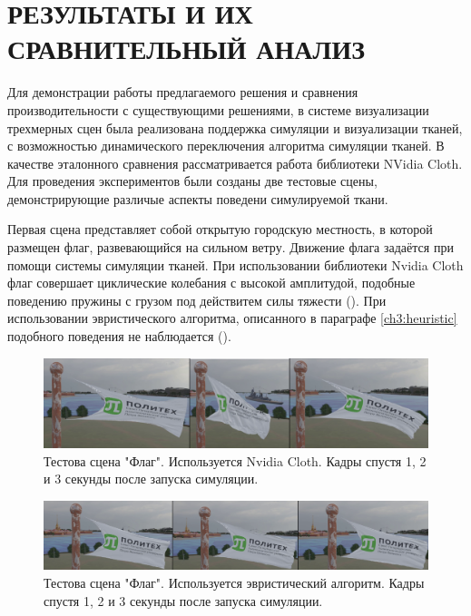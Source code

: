 \chapter{РЕЗУЛЬТАТЫ И ИХ СРАВНИТЕЛЬНЫЙ АНАЛИЗ} \label{ch4}
	Для демонстрации работы предлагаемого решения и сравнения производительности с существующими решениями, в системе визуализации трехмерных сцен  была реализована поддержка симуляции и визуализации тканей, с возможностью динамического переключения алгоритма симуляции тканей. В качестве эталонного сравнения рассматривается работа библиотеки NVidia Cloth. Для проведения экспериментов были созданы две тестовые сцены, демонстрирующие различые аспекты поведени симулируемой ткани. 
	
	Первая сцена представляет собой открытую городскую местность, в которой размещен флаг, развевающийся на сильном ветру. Движение флага задаётся при помощи системы симуляции тканей. При использовании библиотеки Nvidia Cloth флаг совершает циклические колебания с высокой амплитудой, подобные поведению пружины с грузом под действитем силы тяжести (). При использовании эвристического алгоритма, описанного в параграфе \ref{ch3:heuristic} подобного поведения не наблюдается ().
	
	\begin{figure}[ht!] 
		\center
		\includegraphics [scale=0.25] {my_folder/images//streching}	
		\caption{Тестова сцена "Флаг". Используется Nvidia Cloth. Кадры спустя 1, 2 и 3 секунды после запуска симуляции.} 
		\label{fig:flagStreching}
	\end{figure}
	
	\begin{figure}[ht!] 
		\center
		\includegraphics [scale=0.2] {my_folder/images//notStreching}	
		\caption{Тестова сцена "Флаг". Используется эвристический алгоритм. Кадры спустя 1, 2 и 3 секунды после запуска симуляции.} 
		\label{fig:flagNotStreching}
	\end{figure}
	
